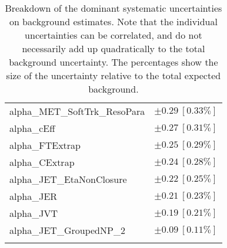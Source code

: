 \begin{table}
\begin{center}
\begin{tabular*}{\textwidth}{@{\extracolsep{\fill}}lc}
alpha\_MET\_SoftTrk\_ResoPara         & $\pm 0.29\ [0.33\%] $       \\
alpha\_cEff         & $\pm 0.27\ [0.31\%] $       \\
alpha\_FTExtrap         & $\pm 0.25\ [0.29\%] $       \\
alpha\_CExtrap         & $\pm 0.24\ [0.28\%] $       \\
alpha\_JET\_EtaNonClosure         & $\pm 0.22\ [0.25\%] $       \\
alpha\_JER         & $\pm 0.21\ [0.23\%] $       \\
alpha\_JVT         & $\pm 0.19\ [0.21\%] $       \\
alpha\_JET\_GroupedNP\_2         & $\pm 0.09\ [0.11\%] $       \\
\noalign{\smallskip}\hline\noalign{\smallskip}
\end{tabular*}
\end{center}
\caption[Breakdown of uncertainty on background estimates]{
Breakdown of the dominant systematic uncertainties on background estimates.
Note that the individual uncertainties can be correlated, and do not necessarily add up quadratically to 
the total background uncertainty. The percentages show the size of the uncertainty relative to the total expected background.
\label{table.results.bkgestimate.uncertainties.VRZE}}
\end{table}
%